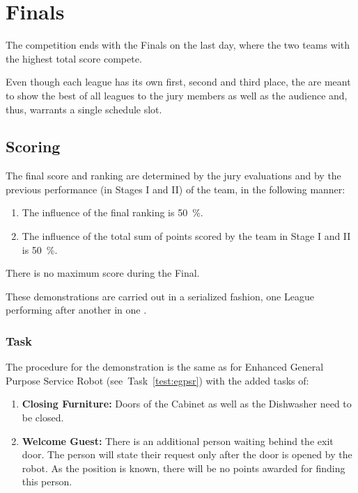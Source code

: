 \chapter{Finals}

The competition ends with the Finals on the last day, where the two teams with the highest total score compete.

Even though each league has its own first, second and third place, the  are meant to show the best of all leagues to the jury members as well as the audience and, thus, warrants a single schedule slot.

\section{Scoring}
The final score and ranking are determined by the jury evaluations and by the previous performance (in Stages I and II) of the team, in the following manner:

\begin{enumerate}
  \item The influence of the final ranking is \SI{50}{\percent}.
  \item The influence of the total sum of points scored by the team in Stage I and II is \SI{50}{\percent}.
\end{enumerate}

There is no maximum score during the Final.

These demonstrations are carried out in a serialized fashion, one League performing after another in one \Arena{}.

\subsection{Task}
The procedure for the demonstration is the same as for Enhanced General Purpose Service Robot (see~Task~\ref{test:egpsr}) with the added tasks of:

\begin{enumerate}[nosep]
\item \textbf{Closing Furniture:} Doors of the Cabinet as well as the Dishwasher need to be closed.
\item \textbf{Welcome Guest:} There is an additional person waiting behind the exit door. The person will state their request only after the door is opened by the robot. As the position is known, there will be no points awarded for finding this person.
\end{enumerate}

